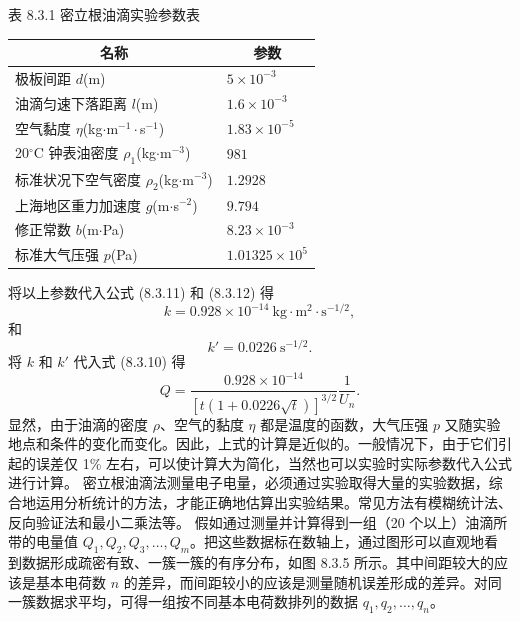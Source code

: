 \begin{center}\small
表 8.3.1 密立根油滴实验参数表\par
\renewcommand{\arraystretch}{1.45}
\begin{tabular}{p{8cm}|p{4cm}}\toprule
\multicolumn{1}{c|}{名称} & \multicolumn{1}{c}{参数}\\\midrule
极板间距 $d$(m) & $5\times10^{-3}$\\
油滴匀速下落距离 $l$(m) & $1.6\times10^{-3}$\\
空气黏度 $\eta$(kg$\cdot$m$^{-1}\cdot$s$^{-1}$) & $1.83\times10^{-5}$\\
20$^\circ$C 钟表油密度 $\rho_1$(kg$\cdot$m$^{-3}$) & $981$\\
标准状况下空气密度 $\rho_2$(kg$\cdot$m$^{-3}$) & $1.2928$\\
上海地区重力加速度 $g$(m$\cdot$s$^{-2}$) & $9.794$\\
修正常数 $b$(m$\cdot$Pa) & $8.23\times10^{-3}$\\
标准大气压强 $p$(Pa) & $1.01325\times10^5$\\\bottomrule
\end{tabular}\end{center}
将以上参数代入公式 (8.3.11) 和 (8.3.12) 得
\begin{equation}k=0.928\times10^{-14}\ \mathrm{kg\cdot m^2\cdot s^{-1/2}},\tag{8.3.17}\end{equation}
和
\begin{equation}k'=0.0226\ \mathrm{s^{-1/2}}.\tag{8.3.18}\end{equation}
将 $k$ 和 $k'$ 代入式 (8.3.10) 得
\begin{equation}Q=\frac{0.928\times10^{-14}}{\left[t\left(1+0.0226\sqrt{t}\right)\right]^{3/2}}\frac{1}{U_n}.\tag{8.3.19}\end{equation}
显然，由于油滴的密度 $\rho$、空气的黏度 $\eta$ 都是温度的函数，大气压强 $p$ 又随实验地点和条件的变化而变化。因此，上式的计算是近似的。一般情况下，由于它们引起的误差仅 1\% 左右，可以使计算大为简化，当然也可以实验时实际参数代入公式进行计算。
密立根油滴法测量电子电量，必须通过实验取得大量的实验数据，综合地运用分析统计的方法，才能正确地估算出实验结果。常见方法有模糊统计法、反向验证法和最小二乘法等。
假如通过测量并计算得到一组（20 个以上）油滴所带的电量值 $Q_1,Q_2,Q_3,\ldots,Q_m$。把这些数据标在数轴上，通过图形可以直观地看到数据形成疏密有致、一簇一簇的有序分布，如图 8.3.5 所示。其中间距较大的应该是基本电荷数 $n$ 的差异，而间距较小的应该是测量随机误差形成的差异。对同一簇数据求平均，可得一组按不同基本电荷数排列的数据 $q_1,q_2,\ldots,q_n$。
